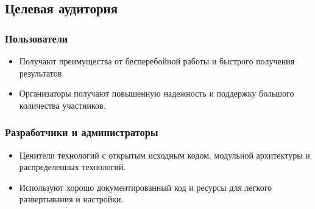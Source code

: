 \subsection{Целевая аудитория}
\subsubsection{Пользователи}
\begin{itemize}
    \itemsep 0em 
    \item Получают преимущества от бесперебойной работы и быстрого получения результатов.
    \item Организаторы получают повышенную надежность и поддержку большого количества участников.
\end{itemize}

\subsubsection{Разработчики и администраторы}
\begin{itemize}
    \itemsep 0em 
    \item Ценители технологий с открытым исходным кодом, модульной архитектуры и распределенных технологий.
    \item Используют хорошо документированный код и ресурсы для легкого развертывания и настройки.
\end{itemize}